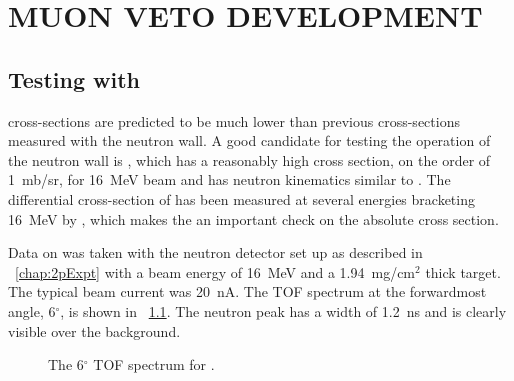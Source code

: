 %
%
%
%
%
%
%
%

%
%

\chapter{MUON VETO DEVELOPMENT}
\label{chap:muVeto}

\section{Testing with \MgReaction}

\GeTargets cross-sections are predicted to be much lower than previous cross-sections measured with the neutron wall.  A good candidate for testing the operation of the neutron wall is \MgReaction, which has a reasonably high cross section, on the order of 1~mb/sr, for 16~MeV  beam and has neutron kinematics similar to \reaction.  The differential cross-section of \MgReaction has been measured at several energies bracketing 16~MeV by \cite{Bohne_Mg}, which makes the \MgReaction an important check on the \reaction absolute cross section.  

Data on \MgReaction was taken with the neutron detector set up as described in {\chap}~\ref{chap:2pExpt} with a beam energy of 16~MeV and a 1.94~mg/cm$^2$ thick  target.  The typical beam current was 20~nA. The TOF spectrum at the forwardmost angle, 6$^{\circ}$, is shown in {\fig}~\ref{fig:MgTOF}.  The neutron peak has a width of 1.2~ns and is clearly visible over the background. 
\begin{figure}[htp]
\vspace{3in}
\caption{The 6$^{\circ}$ TOF spectrum for \MgReaction.}
\label{fig:MgTOF}
\end{figure}

